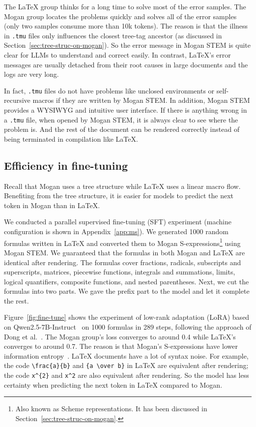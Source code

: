 The \LaTeX{} group thinks for a long time to solve most of the error samples. The Mogan group locates the problems quickly and solves all of the error samples (only two samples consume more than 10k tokens). The reason is that the illness in \texttt{.tmu} files only influences the closest tree-tag ancestor (as discussed in Section~\ref{sec:tree-struc-on-mogan}). So the error message in Mogan STEM is quite clear for LLMs to understand and correct easily. In contrast, \LaTeX{}'s error messages are usually detached from their root causes in large documents and the logs are very long.

In fact, \texttt{.tmu} files do not have problems like unclosed environments or self-recursive macros if they are written by Mogan STEM. In addition, Mogan STEM provides a WYSIWYG and intuitive user interface. If there is anything wrong in a \texttt{.tmu} file, when opened by Mogan STEM, it is always clear to see where the problem is. And the rest of the document can be rendered correctly instead of being terminated in compilation like \LaTeX{}.

\subsection{Efficiency in fine-tuning}
\label{sec:eff-in-sft}

Recall that Mogan uses a tree structure while \LaTeX{} uses a linear macro flow. Benefiting from the tree structure, it is easier for models to predict the next token in Mogan than in \LaTeX{}.

We conducted a parallel supervised fine-tuning (SFT) experiment (machine configuration is shown in Appendix~\ref{app:ms}). We generated 1000 random formulas written in \LaTeX{} and converted them to Mogan S-expressions\footnote{Also known as Scheme representations. It has been discussed in Section~\ref{sec:tree-struc-on-mogan}.} using Mogan STEM. We guaranteed that the formulas in both Mogan and \LaTeX{} are identical after rendering. The formulas cover fractions, radicals, subscripts and superscripts, matrices, piecewise functions, integrals and summations, limits, logical quantifiers, composite functions, and nested parentheses. Next, we cut the formulas into two parts. We gave the prefix part to the model and let it complete the rest.

Figure~\ref{fig:fine-tune} shows the experiment of low-rank adaptation (LoRA) based on Qwen2.5-7B-Instruct~\cite{qwen2025qwen25} on 1000 formulas in 289 steps, following the approach of Dong et al.~\cite{dong2025machinelearninglm}. The Mogan group's loss converges to around 0.4 while \LaTeX{}'s converges to around 0.7. The reason is that Mogan's S-expressions have lower information entropy~\cite{xia2024docgenome}. \LaTeX{} documents have a lot of syntax noise. For example, the code \verb|\frac{a}{b}| and \verb|{a \over b}| in \LaTeX{} are equivalent after rendering; the code \verb|x^{2}| and \verb|x^2| are also equivalent after rendering. So the model has less certainty when predicting the next token in \LaTeX{} compared to Mogan.

